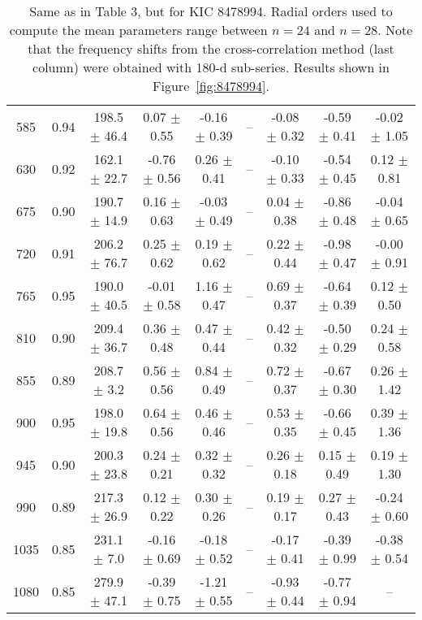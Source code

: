 \documentclass[twocolumn]{aastex61}%
\begin{document}
\begin{table*}[ht]
\begin{tabular}{ccc|ccccc|c}
585 & 0.94 & 198.5 $\pm$ 46.4 & 0.07 $\pm$ 0.55 & -0.16 $\pm$ 0.39 & -- & -0.08 $\pm$ 0.32 & -0.59 $\pm$ 0.41 & -0.02 $\pm$ 1.05\\
630 & 0.92 & 162.1 $\pm$ 22.7 & -0.76 $\pm$ 0.56 & 0.26 $\pm$ 0.41 & -- & -0.10 $\pm$ 0.33 & -0.54 $\pm$ 0.45 & 0.12 $\pm$ 0.81\\
675 & 0.90 & 190.7 $\pm$ 14.9 & 0.16 $\pm$ 0.63 & -0.03 $\pm$ 0.49 & -- & 0.04 $\pm$ 0.38 & -0.86 $\pm$ 0.48 & -0.04 $\pm$ 0.65\\
720 & 0.91 & 206.2 $\pm$ 76.7 & 0.25 $\pm$ 0.62 & 0.19 $\pm$ 0.62 & -- & 0.22 $\pm$ 0.44 & -0.98 $\pm$ 0.47 & -0.00 $\pm$ 0.91\\
765 & 0.95 & 190.0 $\pm$ 40.5 & -0.01 $\pm$ 0.58 & 1.16 $\pm$ 0.47 & -- & 0.69 $\pm$ 0.37 & -0.64 $\pm$ 0.39 & 0.12 $\pm$ 0.50\\
810 & 0.90 & 209.4 $\pm$ 36.7 & 0.36 $\pm$ 0.48 & 0.47 $\pm$ 0.44 & -- & 0.42 $\pm$ 0.32 & -0.50 $\pm$ 0.29 & 0.24 $\pm$ 0.58\\
855 & 0.89 & 208.7 $\pm$ 3.2 & 0.56 $\pm$ 0.56 & 0.84 $\pm$ 0.49 & -- & 0.72 $\pm$ 0.37 & -0.67 $\pm$ 0.30 & 0.26 $\pm$ 1.42\\
900 & 0.95 & 198.0 $\pm$ 19.8 & 0.64 $\pm$ 0.56 & 0.46 $\pm$ 0.46 & -- & 0.53 $\pm$ 0.35 & -0.66 $\pm$ 0.45 & 0.39 $\pm$ 1.36\\
945 & 0.90 & 200.3 $\pm$ 23.8 & 0.24 $\pm$ 0.21 & 0.32 $\pm$ 0.32 & -- & 0.26 $\pm$ 0.18 & 0.15 $\pm$ 0.49 & 0.19 $\pm$ 1.30\\
990 & 0.89 & 217.3 $\pm$ 26.9 & 0.12 $\pm$ 0.22 & 0.30 $\pm$ 0.26 & -- & 0.19 $\pm$ 0.17 & 0.27 $\pm$ 0.43 & -0.24 $\pm$ 0.60\\
1035 & 0.85 & 231.1 $\pm$ 7.0 & -0.16 $\pm$ 0.69 & -0.18 $\pm$ 0.52 & -- & -0.17 $\pm$ 0.41 & -0.39 $\pm$ 0.99 & -0.38 $\pm$ 0.54\\
1080 & 0.85 & 279.9 $\pm$ 47.1 & -0.39 $\pm$ 0.75 & -1.21 $\pm$ 0.55 & -- & -0.93 $\pm$ 0.44 & -0.77 $\pm$ 0.94 & --\\
\end{tabular}
\caption{Same as in Table 3, but for KIC 8478994. {Radial orders used to compute the mean parameters range between $n=24$ and $n=28$.} Note that the frequency shifts from the cross-correlation method (last column) were obtained with 180-d sub-series. Results shown in Figure~\ref{fig:8478994}.}\label{tab:8478994}
\end{table*}
\end{document}

